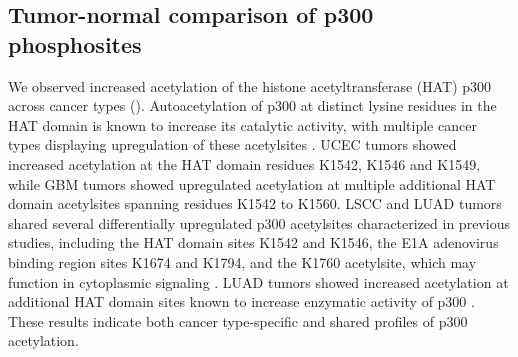 \subsection{Tumor-normal comparison of p300 phosphosites}
We observed increased acetylation of the histone acetyltransferase (HAT) p300 across cancer types (). Autoacetylation of p300 at distinct lysine residues in the HAT domain is known to increase its catalytic activity, with multiple cancer types displaying upregulation of these acetylsites \cite{thompsonpr_colepa:RegulationP3002004}. UCEC tumors showed increased acetylation at the HAT domain residues K1542, K1546 and K1549, while GBM tumors showed upregulated acetylation at multiple additional HAT domain acetylsites spanning residues K1542 to K1560. LSCC and LUAD tumors shared several differentially upregulated p300 acetylsites characterized in previous studies, including the HAT domain sites K1542 and K1546, the E1A adenovirus binding region sites K1674 and K1794, and the K1760 acetylsite, which may function in cytoplasmic signaling \cite{thompsonpr_colepa:RegulationP3002004,zhangt_zhangf:ING5Differentially2018,grimesm_combm:IntegrationProtein2018}. LUAD tumors showed increased acetylation at additional HAT domain sites known to increase enzymatic activity of p300 \cite{thompsonpr_colepa:RegulationP3002004}. These results indicate both cancer type-specific and shared profiles of p300 acetylation.

